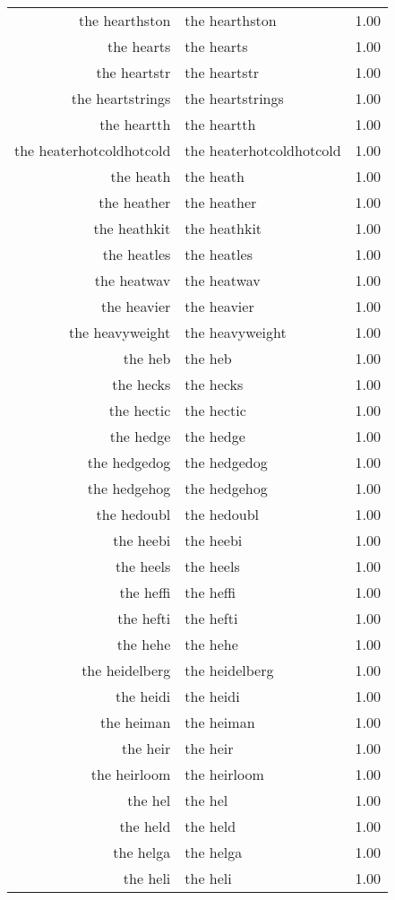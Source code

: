 \begin{table}[ht]
\begin{tabular}{rlr}
  the hearthston & the hearthston & 1.00 \\ 
  the hearts & the hearts & 1.00 \\ 
  the heartstr & the heartstr & 1.00 \\ 
  the heartstrings & the heartstrings & 1.00 \\ 
  the heartth & the heartth & 1.00 \\ 
  the heaterhotcoldhotcold & the heaterhotcoldhotcold & 1.00 \\ 
  the heath & the heath & 1.00 \\ 
  the heather & the heather & 1.00 \\ 
  the heathkit & the heathkit & 1.00 \\ 
  the heatles & the heatles & 1.00 \\ 
  the heatwav & the heatwav & 1.00 \\ 
  the heavier & the heavier & 1.00 \\ 
  the heavyweight & the heavyweight & 1.00 \\ 
  the heb & the heb & 1.00 \\ 
  the hecks & the hecks & 1.00 \\ 
  the hectic & the hectic & 1.00 \\ 
  the hedge & the hedge & 1.00 \\ 
  the hedgedog & the hedgedog & 1.00 \\ 
  the hedgehog & the hedgehog & 1.00 \\ 
  the hedoubl & the hedoubl & 1.00 \\ 
  the heebi & the heebi & 1.00 \\ 
  the heels & the heels & 1.00 \\ 
  the heffi & the heffi & 1.00 \\ 
  the hefti & the hefti & 1.00 \\ 
  the hehe & the hehe & 1.00 \\ 
  the heidelberg & the heidelberg & 1.00 \\ 
  the heidi & the heidi & 1.00 \\ 
  the heiman & the heiman & 1.00 \\ 
  the heir & the heir & 1.00 \\ 
  the heirloom & the heirloom & 1.00 \\ 
  the hel & the hel & 1.00 \\ 
  the held & the held & 1.00 \\ 
  the helga & the helga & 1.00 \\ 
  the heli & the heli & 1.00 \\ 

\end{tabular}
\end{table}
